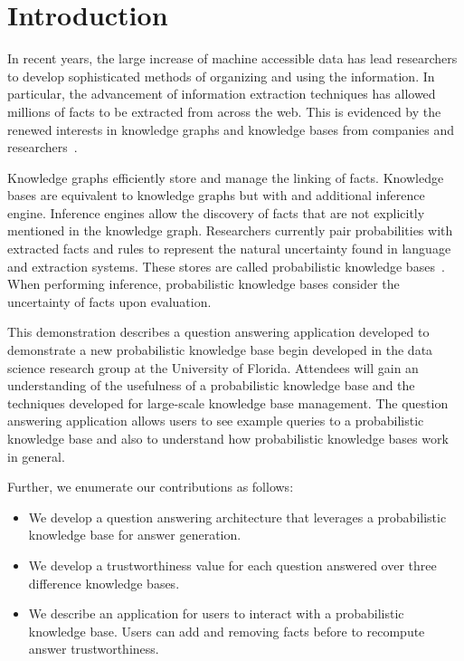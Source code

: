 

\section{Introduction}


In recent years, the large increase of machine accessible data has lead researchers
to develop sophisticated methods of organizing and using the information.
In particular, the advancement of information extraction techniques has allowed
millions of facts to be extracted from across the web.
This is evidenced by the renewed interests in knowledge graphs and knowledge bases
from companies and
researchers~\cite{bellare2013woo,chang2014typed,dong2014knowledge,niu2012deepdive}.

Knowledge graphs efficiently store and manage the linking of facts.
Knowledge bases are equivalent to knowledge graphs but with and additional
inference engine. 
Inference engines allow the discovery of facts that are not explicitly
mentioned in the knowledge graph.
Researchers currently pair probabilities with extracted facts and rules to
represent the natural uncertainty found in language and extraction systems.
These stores are called probabilistic knowledge bases~\cite{chen2014knowledge}.
When performing inference, probabilistic knowledge bases consider the uncertainty
of facts upon evaluation.

This demonstration describes a question answering application developed to demonstrate
a new probabilistic knowledge base begin developed in the data science research group at the University of Florida.
Attendees will gain an understanding of the usefulness of a probabilistic
knowledge base and the techniques developed for large-scale knowledge base
management.
The question answering application allows users to see example queries to a
probabilistic knowledge base and also to understand how probabilistic knowledge bases work in general.

Further, we enumerate our contributions as follows:
\begin{itemize}
\vspace{-0.5em}
\item We develop a question answering architecture that leverages a probabilistic knowledge base for answer generation.

\vspace{-0.5em}
\item We develop a trustworthiness value for each question answered over three difference knowledge bases.

\vspace{-0.5em}
\item We describe an application for users to interact with a probabilistic knowledge
base. Users can add and removing facts before to recompute answer
trustworthiness.
\end{itemize}


